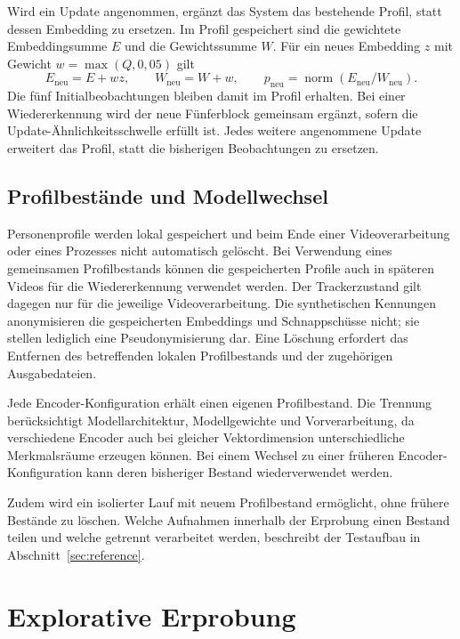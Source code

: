 \documentclass[runningheads,a4paper]{llncs}
\begin{document}
Wird ein Update angenommen, ergänzt das System das bestehende Profil, statt dessen Embedding zu ersetzen. Im Profil gespeichert sind die gewichtete Embeddingsumme $E$ und die Gewichtssumme $W$. Für ein neues Embedding $z$ mit Gewicht $w=\max(Q,0{,}05)$ gilt
\begin{equation}
E_{\mathrm{neu}}=E+wz,\qquad W_{\mathrm{neu}}=W+w,\qquad
p_{\mathrm{neu}}=\operatorname{norm}(E_{\mathrm{neu}}/W_{\mathrm{neu}}).
\label{eq:profile-update}
\end{equation}
Die fünf Initialbeobachtungen bleiben damit im Profil erhalten. Bei einer Wiedererkennung wird der neue Fünferblock gemeinsam ergänzt, sofern die Update-Ähnlichkeitsschwelle erfüllt ist. Jedes weitere angenommene Update erweitert das Profil, statt die bisherigen Beobachtungen zu ersetzen.

\subsection{Profilbestände und Modellwechsel}
Personenprofile werden lokal gespeichert und beim Ende einer Videoverarbeitung oder eines Prozesses nicht automatisch gelöscht. Bei Verwendung eines gemeinsamen Profilbestands können die gespeicherten Profile auch in späteren Videos für die Wiedererkennung verwendet werden. Der Trackerzustand gilt dagegen nur für die jeweilige Videoverarbeitung. Die synthetischen Kennungen anonymisieren die gespeicherten Embeddings und Schnappschüsse nicht; sie stellen lediglich eine Pseudonymisierung dar. Eine Löschung erfordert das Entfernen des betreffenden lokalen Profilbestands und der zugehörigen Ausgabedateien.

Jede Encoder-Konfiguration erhält einen eigenen Profilbestand. Die Trennung berücksichtigt Modellarchitektur, Modellgewichte und Vorverarbeitung, da verschiedene Encoder auch bei gleicher Vektordimension unterschiedliche Merkmalsräume erzeugen können. Bei einem Wechsel zu einer früheren Encoder-Konfiguration kann deren bisheriger Bestand wiederverwendet werden.

Zudem wird ein isolierter Lauf mit neuem Profilbestand ermöglicht, ohne frühere Bestände zu löschen. Welche Aufnahmen innerhalb der Erprobung einen Bestand teilen und welche getrennt verarbeitet werden, beschreibt der Testaufbau in Abschnitt~\ref{sec:reference}.

\section{Explorative Erprobung}
\label{sec:evaluation}
\end{document}
